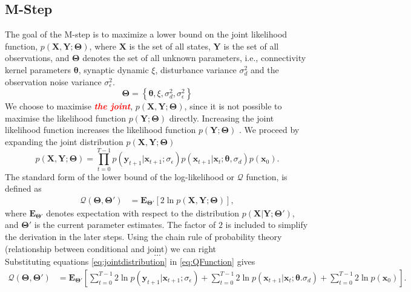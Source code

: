 \documentclass[]{article}
\newcommand{\dean}[1]{\textsf{\emph{\textbf{\textcolor{red}{#1}}}}}
\begin{document}
\subsection{M-Step}
The goal of the M-step is to maximize a lower bound on the joint likelihood function, $p(\mathbf X,\mathbf Y;\boldsymbol \Theta)$, where $\mathbf X$ is the set of all states, $\mathbf Y$ is the set of all observations, and $\boldsymbol \Theta$ denotes the set of all unknown parameters, i.e., connectivity kernel parameters $\boldsymbol\theta$, synaptic dynamic $\xi$, disturbance variance $\sigma^2_d$ and the observation noise variance $\sigma^2_{\epsilon}$.
\begin{equation}
	\boldsymbol\Theta = \left\lbrace \boldsymbol\theta, \xi, \sigma^2_d, \sigma^2_{\epsilon}\right\rbrace 
\end{equation} We choose to maximise \dean{the joint}, $p(\mathbf X,\mathbf Y;\boldsymbol \Theta)$, since it is not  possible to maximise the likelihood function $p(\mathbf Y;\boldsymbol\Theta)$ directly. Increasing the joint likelihood function increases the likelihood function $p(\mathbf Y;\boldsymbol \Theta)$ \cite{McLachlan1997}. We proceed by expanding the joint distribution $p(\mathbf X,\mathbf Y;\boldsymbol \Theta)$
\begin{equation}\label{eq:jointdistribution}
 p(\mathbf X,\mathbf Y;\boldsymbol \Theta)=\prod_{t=0}^{T-1} p(\mathbf y_{t+1}|\mathbf x_{t+1}; \sigma_{\epsilon})p(\mathbf x_{t+1}|\mathbf x_{t};\boldsymbol \theta, \sigma_d)p(\mathbf x_0).
\end{equation}
The standard form of the lower bound of the log-likelihood or $\mathcal{Q}$ function, is defined as   
\begin{align}\label{eq:QFunction}
 \mathcal Q(\boldsymbol \Theta,\boldsymbol\Theta')&=\mathbf E_{\boldsymbol \Theta'}\left[2\ln p(\mathbf X,\mathbf Y;\boldsymbol \Theta)\right],
\end{align}
where $ \mathbf E_{\boldsymbol \Theta'}$ denotes expectation with respect to the distribution $p(\mathbf X | \mathbf Y;\boldsymbol \Theta')$, and $\boldsymbol \Theta'$ is the current parameter estimates. The factor of $2$ is included to simplify the derivation in the later steps. Using the chain rule of probability theory (relationship between conditional and joint) we can right
\begin{equation}
	... \nonumber
\end{equation}
 Substituting equations \ref{eq:jointdistribution} in \ref{eq:QFunction} gives
\begin{align}
 \mathcal Q(\boldsymbol \Theta,\boldsymbol\Theta')&=\mathbf E_{\boldsymbol\Theta'}\left[\sum_{t=0}^{T-1}2\ln p(\mathbf y_{t+1}|\mathbf x_{t+1};\sigma_{\epsilon})+\sum_{t=0}^{T-1}2\ln p(\mathbf x_{t+1}|\mathbf x_{t};\boldsymbol \theta. \sigma_d)+\sum_{t=0}^{T-1}2\ln p(\mathbf x_0)\right].
\end{align}
\end{document}
